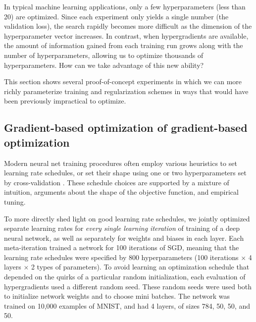 \documentclass{article}
\begin{document}
In typical machine learning applications, only a few hyperparameters (less than 20) are optimized.
Since each experiment only yields a single number (the validation loss), the search rapidly becomes more difficult as the dimension of the hyperparameter vector increases.
In contrast, when hypergradients are available, the amount of information gained from each training run grows along with the number of hyperparameters, allowing us to optimize thousands of hyperparameters. %
How can we take advantage of this new ability?

This section shows several proof-of-concept experiments in which we can more richly parameterize training and regularization schemes in ways that would have been previously impractical to optimize.

\subsection{Gradient-based optimization of gradient-based optimization}
\label{sec:schedule experiments}
Modern neural net training procedures often employ various heuristics to set learning rate schedules, or set their shape using one or two hyperparameters set by cross-validation \cite{dahl2014multi, sutskever2013importance}.
These schedule choices are supported by a mixture of intuition, arguments about the shape of the objective function, and empirical tuning.

To more directly shed light on good learning rate schedules, we jointly optimized separate learning rates for \emph{every single learning iteration} of training of a deep neural network, as well as separately for weights and biases in each layer.
Each meta-iteration trained a network for 100 iterations of SGD, meaning that the learning rate schedules were specified by 800 hyperparameters (100 iterations $\times$ 4 layers $\times$ 2 types of parameters).
To avoid learning an optimization schedule that depended on the quirks of a particular random initialization, each evaluation of hypergradients used a different random seed.
These random seeds were used both to initialize network weights and to choose mini batches.
The network was trained on 10,000 examples of MNIST, and had 4 layers, of sizes 784, 50, 50, and 50.
\end{document}
